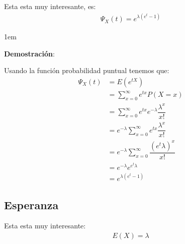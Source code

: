 \documentclass[12pt, fleqn]{report}                             %
\newenvironment{SmallIndentation}[1][0.75em]                    %
        {\begin{adjustwidth}{#1}{}\begin{footnotesize}}             %
        {\end{footnotesize}\end{adjustwidth}}                       %
\theoremstyle{break}                                            %
\begin{document}
                Esta esta muy interesante, es:
                \begin{align*}
                    \Psi_X(t) 
                        = e^{\lambda(e^t - 1)}
                \end{align*}

                \begin{SmallIndentation}[1em]
                    \textbf{Demostración}:
                    
                    Usando la función probabilidad puntual tenemos que:
                    \begin{align*}
                        \Psi_X(t) 
                            &= E( e^{tX} )                                                       \\
                            &= \sum_{x = 0}^\infty e^{tx} P(X = x)                               \\
                            &= \sum_{x = 0}^\infty e^{tx} e^{- \lambda} \dfrac{\lambda^x}{x!}    \\
                            &= e^{- \lambda} \sum_{x = 0}^\infty e^{tx} \dfrac{\lambda^x}{x!}    \\
                            &= e^{- \lambda} \sum_{x = 0}^\infty \dfrac{(e^t \lambda)^x}{x!}     \\
                            &= e^{- \lambda} e^{e^t \lambda}                                     \\   
                            &= e^{\lambda(e^t - 1)}
                    \end{align*}
                
                \end{SmallIndentation}
                    

            \clearpage
            \subsection{Esperanza}

                Esta esta muy interesante:
                \begin{align*}
                    E(X) = \lambda               
                \end{align*}
\end{document}
